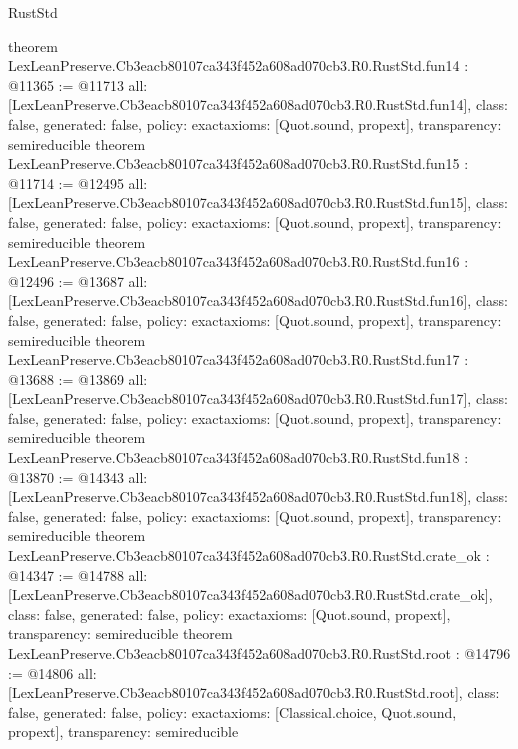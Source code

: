 \begin{lexlean}{RustStd}
\begin{coremodule}
{}
theorem LexLeanPreserve.Cb3eacb80107ca343f452a608ad070cb3.R0.RustStd.fun14 : @11365 := @11713 {
  all: [LexLeanPreserve.Cb3eacb80107ca343f452a608ad070cb3.R0.RustStd.fun14],
  class: false,
  generated: false,
  policy: exact{axioms: [Quot.sound, propext]},
  transparency: semireducible
}
theorem LexLeanPreserve.Cb3eacb80107ca343f452a608ad070cb3.R0.RustStd.fun15 : @11714 := @12495 {
  all: [LexLeanPreserve.Cb3eacb80107ca343f452a608ad070cb3.R0.RustStd.fun15],
  class: false,
  generated: false,
  policy: exact{axioms: [Quot.sound, propext]},
  transparency: semireducible
}
theorem LexLeanPreserve.Cb3eacb80107ca343f452a608ad070cb3.R0.RustStd.fun16 : @12496 := @13687 {
  all: [LexLeanPreserve.Cb3eacb80107ca343f452a608ad070cb3.R0.RustStd.fun16],
  class: false,
  generated: false,
  policy: exact{axioms: [Quot.sound, propext]},
  transparency: semireducible
}
theorem LexLeanPreserve.Cb3eacb80107ca343f452a608ad070cb3.R0.RustStd.fun17 : @13688 := @13869 {
  all: [LexLeanPreserve.Cb3eacb80107ca343f452a608ad070cb3.R0.RustStd.fun17],
  class: false,
  generated: false,
  policy: exact{axioms: [Quot.sound, propext]},
  transparency: semireducible
}
theorem LexLeanPreserve.Cb3eacb80107ca343f452a608ad070cb3.R0.RustStd.fun18 : @13870 := @14343 {
  all: [LexLeanPreserve.Cb3eacb80107ca343f452a608ad070cb3.R0.RustStd.fun18],
  class: false,
  generated: false,
  policy: exact{axioms: [Quot.sound, propext]},
  transparency: semireducible
}
theorem LexLeanPreserve.Cb3eacb80107ca343f452a608ad070cb3.R0.RustStd.crate_ok : @14347 := @14788 {
  all: [LexLeanPreserve.Cb3eacb80107ca343f452a608ad070cb3.R0.RustStd.crate_ok],
  class: false,
  generated: false,
  policy: exact{axioms: [Quot.sound, propext]},
  transparency: semireducible
}
theorem LexLeanPreserve.Cb3eacb80107ca343f452a608ad070cb3.R0.RustStd.root : @14796 := @14806 {
  all: [LexLeanPreserve.Cb3eacb80107ca343f452a608ad070cb3.R0.RustStd.root],
  class: false,
  generated: false,
  policy: exact{axioms: [Classical.choice, Quot.sound, propext]},
  transparency: semireducible
}


\end{coremodule}
\end{lexlean}
